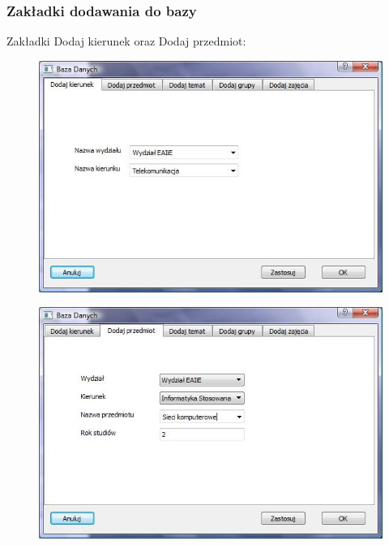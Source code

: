 \documentclass{beamer}
\begin{document}
\begin{frame}
\frametitle{Zakładki dodawania do bazy}

Zakładki Dodaj kierunek oraz Dodaj przedmiot:
\begin{figure}
\includegraphics{dodaj_kierunek.jpg}
\end{figure}
\begin{figure}
\includegraphics{dodaj_przedmiot.jpg}
\end{figure}
\end{frame}
\end{document}
